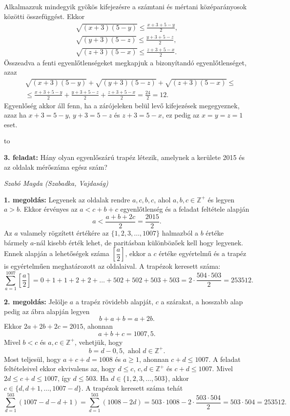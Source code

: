 \documentclass[a4paper,10pt,leqno]{article}
\newcommand{\ki}[2]{\hfill {\it #1 (#2)}\medskip}
\newcommand{\vonal}{\hbox to \hsize{\hskip2truecm\hrulefill\hskip2truecm}}
\begin{document}
Alkalmazzuk mindegyik gyökös kifejezésre a számtani és mértani középarányosok közötti összefüggést. Ekkor
\begin{align*}
\sqrt{(x+3)(5-y)}\le\frac{x+3+5-y}{2},\\
\sqrt{(y+3)(5-z)}\le\frac{y+3+5-z}{2},\\
\sqrt{(z+3)(5-x)}\le\frac{z+3+5-x}{2}.
\end{align*}
Összeadva a fenti egyenlőtlenségeket megkapjuk a bizonyítandó egyenlőtlenséget, azaz
\begin{align*}
~&\sqrt{(x+3)(5-y)}+
\sqrt{(y+3)(5-z)}+
\sqrt{(z+3)(5-x)}\le\\
~&\le\frac{x+3+5-y}{2}+
\frac{y+3+5-z}{2}+
\frac{z+3+5-x}{2}=\frac{24}{2}=12.
\end{align*}
Egyenlőség akkor áll fenn, ha a zárójeleken belül levő kifejezések megegyeznek, azaz 
ha $x+3=5-y$, $y+3=5-z$ és $z+3=5-x$, ez pedig az  $x=y=z=1$ eset. 

\vonal


{\bf 3. feladat: } Hány olyan egyenlőszárú trapéz létezik, amelynek a kerülete 2015 és az oldalak mérőszáma egész szám?

\ki{Szabó Magda}{Szabadka, Vajdaság}\medskip

{\bf 1. megoldás: } Legyenek az oldalak rendre $a, c, b, c$, ahol $a, b, c\in\mathbb{Z}^+$ és legyen $a>b$. Ekkor érvényes az $a<c+b+c$ egyenlőtlenség és a feladat feltétele alapján
$$a<\frac{a+b+2c}{2}=\frac{2015}{2}.$$
Az $a$ valamely rögzített értékére az $\{1, 2, 3,\ldots, 1007\}$ halmazból a $b$ értéke bármely $a$-nál kisebb érték lehet, de paritásban különbözőek kell hogy legyenek. Ennek alapján a lehetőségek száma $\left[\dfrac{a}{2}\right]$, ekkor a $c$ értéke egyértelmű és a trapéz is egyértelműen meghatározott az oldalaival. A trapézok keresett száma:
$$\sum_{a=1}^{1007}\left[\frac{a}{2}\right]=
0+1+1+2+2+\ldots+502+502+503+503=
2\cdot\frac{504\cdot 503}{2}=253512.$$

{\bf 2. megoldás: } Jelölje $a$ a trapéz rövidebb alapját, $c$ a szárakat, a hosszabb alap pedig az ábra alapján legyen
$$b+a+b=a+2b.$$
 Ekkor $2a+2b+2c=2015$, ahonnan
$$a+b+c=1007{,}5.$$
Mivel $b<c$ és $a,c\in \mathbb{Z}^+$, vehetjük, hogy
$$b=d-0{,}5, \text{~ahol~} d\in\mathbb{Z}^+.$$
Most teljesül, hogy 
$a+c+d=1008$ és $a\ge 1$, ahonnan $c+d\le 1007$.
A feladat feltételeivel ekkor ekvivalens az, hogy 
$d\le c$, $c, d\in\mathbb{Z}^+$ és $c+d\le 1007$. 
Mivel $2d\le c+d\le 1007$, így $d\le 503$. 
Ha $d\in\{1, 2, 3,\ldots, 503\}$, akkor 
$c\in\{d, d+1,\ldots,1007-d\}$.
A trapézok keresett száma tehát
$$\sum_{d=1}^{503}(1007-d-d+1)=
\sum_{d=1}^{503}(1008-2d)=
503\cdot 1008-2\cdot\frac{503\cdot 504}{2}=
503\cdot 504=253512.$$
\end{document}
